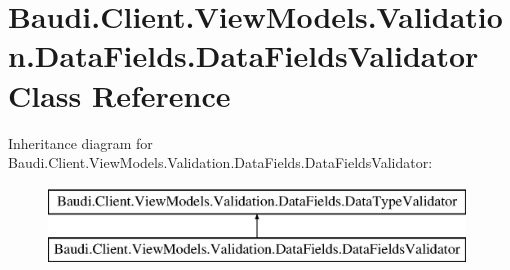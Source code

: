 \hypertarget{class_baudi_1_1_client_1_1_view_models_1_1_validation_1_1_data_fields_1_1_data_fields_validator}{}\section{Baudi.\+Client.\+View\+Models.\+Validation.\+Data\+Fields.\+Data\+Fields\+Validator Class Reference}
\label{class_baudi_1_1_client_1_1_view_models_1_1_validation_1_1_data_fields_1_1_data_fields_validator}
Inheritance diagram for Baudi.\+Client.\+View\+Models.\+Validation.\+Data\+Fields.\+Data\+Fields\+Validator\+:\begin{figure}[H]
\begin{center}
\leavevmode
\includegraphics[height=2.000000cm]{class_baudi_1_1_client_1_1_view_models_1_1_validation_1_1_data_fields_1_1_data_fields_validator}
\end{center}
\end{figure}
